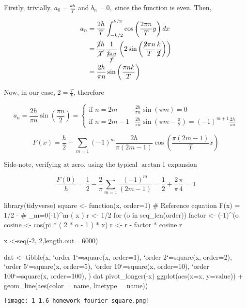 \documentclass[../main/main.tex]{subfiles}
\begin{document}
	
	Firstly, trivially, $a_{0}=\frac{kh}{T}$ and $b_{n} = 0,$ since the function is even.
	Then, 
	
	\begin{align*}
	a_{n} &= \frac{2h}{T} \fourier[-k/2][k/2]{ \cos\left(\frac{2\pi n}{T} y\right)} \\
		&= \frac{\cancel{2}h}{\cancel{T}}\frac{1}{\frac{\cancel{2}\pi n}{\cancel{T}}}\left( 2\sin\left(\frac{\cancel{2}\pi n}{T} \frac{k}{\cancel{2}}\right)  \right)\\
		&= \frac{2h}{\pi n} \sin\left(\frac{\pi n k}{T} \right)
	\end{align*}
	
	Now, in our case, $2 = \frac T k$, therefore
	
	\begin{equation*}
	a_{n} = \frac{2h}{\pi n} \sin\left(\frac{\pi n }{2} \right) = 
	\begin{cases}
	\textrm{if $n=2m$ } & \frac{2h}{\pi n} \sin\left(\pi m  \right) = 0\\
	\textrm{if $n=2m-1$} &\frac{2h}{\pi n} \sin\left(\pi m - \frac \pi 2\right) = (-1)^{m+1}\frac{2h }{\pi n}
	\end{cases}
	\end{equation*}
	
	\begin{equation*}	
	\boxed{
		F(x) = \frac{h}{2} - 
			\sum_{m=1}(-1)^{m}\frac{2h }{\pi (2m-1)}
				\cos\left(\frac{\pi (2m -1)}{T} x \right)
	}
	\end{equation*}

Side-note, verifying at zero, using the typical $\arctan 1$ expansion

	\begin{equation*}
	\frac{F(0)}{h}
	= \frac{1}{2} - \frac 2 \pi \sum_{m=1}\frac{(-1)^{m}}{(2m-1)} 
	= \frac{1}{2} + \frac 2 \pi  \frac \pi 4 
	= 1
	\end{equation*}	

\pagebreak
\begin{center}
 
\begin{rcode}
library(tidyverse)
square <- function(x, order=1) {
#  Reference equation F(x) = 1/2 - 
#    \sum_{m=0}(-1)^{m} \cos( x )
  r <- 1/2
  for (o in seq_len(order)) {
    factor <- (-1)^(o %
    cosine <- cos(pi * ( 2 * o - 1 ) * x)
    r <- r - factor * cosine
  }
  r
}

x <-seq(-2, 2,length.out= 6000)

dat <- tibble(x, 
             `order 1`=square(x, order=1), 
             `order 2`=square(x, order=2), 
             `order 5`=square(x, order=5), 
             `order 10`=square(x, order=10),
             `order 100`=square(x, order=100),
)
dat %
  pivot_longer(-x) %
  ggplot(aes(x=x, y=value)) +
  geom_line(aes(color = name, linetype = name)) 
\end{rcode}
\texttt{[image: 1-1.6-homework-fourier-square.png]}
\end{center}
\end{document}
